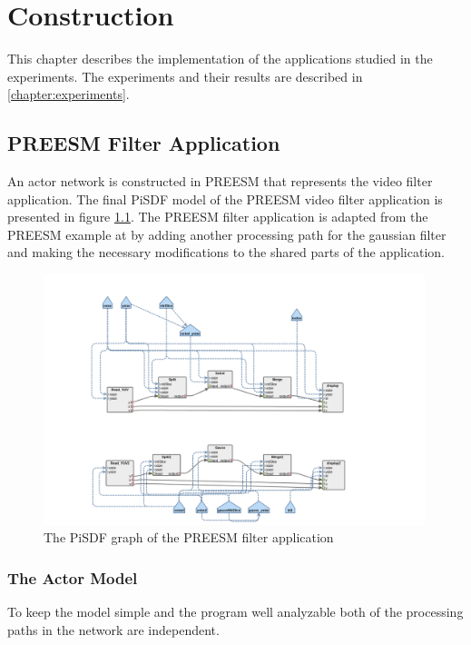 \chapter{Construction}
\label{chapter:construction}
This chapter describes the implementation of the applications studied in the
experiments. The experiments and their results are described in
\ref{chapter:experiments}. 

\section{PREESM Filter Application}
\label{sec:preesmapp}
An actor network is constructed in PREESM that represents the video filter
application. The final PiSDF model of the PREESM video filter application is
presented in figure \ref{fig:preesm_actors}. The PREESM filter application is
adapted from the PREESM example at \cite{preesmtut} by adding another
processing path for the gaussian filter and making the necessary modifications
to the shared parts of the application.

\begin{figure}[h!]
    \begin{center}
        \includegraphics[width=0.99\textwidth]{images/preesm_diagram.png}
        \caption{The PiSDF graph of the PREESM filter application}
        \label{fig:preesm_actors}
    \end{center}
\end{figure}

\subsection{The Actor Model}
\label{subsec:actors}
To keep the model simple and the program well analyzable both of the processing
paths in the network are independent. 

